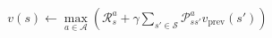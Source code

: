 \documentclass[preview]{standalone}
\begin{document}
\begin{align*}
\quad\quad v(s) \leftarrow \max_{a \in \mathcal{A}} \left(\mathcal{R}_s^a + \gamma \sum_{s' \in \mathcal{S}} \mathcal{P}_{ss'}^a v_{\text{prev}}(s')\right)
\end{align*}
\end{document}
